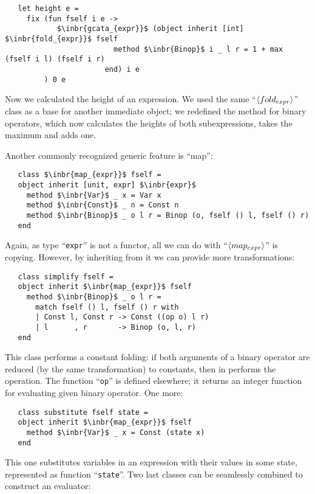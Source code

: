\begin{lstlisting}
   let height e =
     fix (fun fself i e ->
            $\inbr{gcata_{expr}}$ (object inherit [int] $\inbr{fold_{expr}}$ fself
                         method $\inbr{Binop}$ i _ l r = 1 + max (fself i l) (fself i r) 
                       end) i e
         ) 0 e
\end{lstlisting}

Now we calculated the height of an expression. We used the same ``$\left<fold_{expr}\right>$'' class as a base for another immediate object; we redefined the method for
binary operators, which now calculates the heights of both subexpressions, takes the maximum and adds one. 

Another commonly recognized generic feature is ``map'':

\begin{lstlisting}
   class $\inbr{map_{expr}}$ fself =
   object inherit [unit, expr] $\inbr{expr}$
     method $\inbr{Var}$ _ x = Var x
     method $\inbr{Const}$ _ n = Const n
     method $\inbr{Binop}$ _ o l r = Binop (o, fself () l, fself () r)
   end
\end{lstlisting}

Again, as type ``\lstinline{expr}'' is not a functor, all we can do with ``$\left<map_{expr}\right>$'' is copying. However, by inheriting from it we
can provide more transformations:

\begin{lstlisting}
   class simplify fself =
   object inherit $\inbr{map_{expr}}$ fself
     method $\inbr{Binop}$ _ o l r =
       match fself () l, fself () r with
       | Const l, Const r -> Const ((op o) l r)
       | l      , r       -> Binop (o, l, r)     
   end
\end{lstlisting}

This class performs a constant folding: if both arguments of a binary operator are reduced (by the same transformation) to constants, then in
performs the operation. The function ``\lstinline{op}'' is defined elsewhere; it returns an integer function for evaluating given binary operator. One more:


\begin{lstlisting}
   class substitute fself state =
   object inherit $\inbr{map_{expr}}$ fself
     method $\inbr{Var}$ _ x = Const (state x)  
   end
\end{lstlisting}

This one substitutes variables in an expression with their values in some state, represented as function ``\lstinline{state}''. Two last
classes can be seamlessly combined to construct an evaluator:


